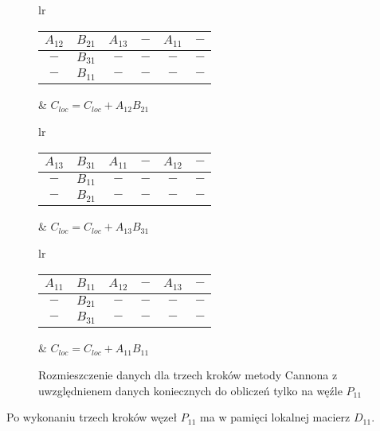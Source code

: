 \begin{figure}[h]
\centering
\begin{tabular}{lr}
\begin{tabular}{|cc|cc|cc|}
\hline
\(A_{12}\) & \(B_{21}\) & \(A_{13}\) & \(-\) & \(A_{11}\) & \(-\) \\
\hline
\(-\) & \(B_{31}\) & \(-\) & \(-\) & \(-\) & \(-\) \\
\hline
\(-\) & \(B_{11}\) & \(-\) & \(-\) & \(-\) & \(-\) \\
\hline
\end{tabular} &
\hspace{1cm}\(C_{loc}=C_{loc}+A_{12}B_{21}\)
\end{tabular}

\vspace{0.5cm}

\begin{tabular}{lr}
\begin{tabular}{|cc|cc|cc|}
\hline
\(A_{13}\) & \(B_{31}\) & \(A_{11}\) & \(-\) & \(A_{12}\) & \(-\) \\
\hline
\(-\) & \(B_{11}\) & \(-\) & \(-\) & \(-\) & \(-\) \\
\hline
\(-\) & \(B_{21}\) & \(-\) & \(-\) & \(-\) & \(-\) \\
\hline
\end{tabular} &
\hspace{1cm}\(C_{loc}=C_{loc}+A_{13}B_{31}\)
\end{tabular}

\vspace{0.5cm}

\begin{tabular}{lr}
\begin{tabular}{|cc|cc|cc|}
\hline
\(A_{11}\) & \(B_{11}\) & \(A_{12}\) & \(-\) & \(A_{13}\) & \(-\) \\
\hline
\(-\) & \(B_{21}\) & \(-\) & \(-\) & \(-\) & \(-\) \\
\hline
\(-\) & \(B_{31}\) & \(-\) & \(-\) & \(-\) & \(-\) \\
\hline
\end{tabular} &
\hspace{1cm}\(C_{loc}=C_{loc}+A_{11}B_{11}\)
\end{tabular}
\caption{Rozmieszczenie danych dla trzech kroków metody Cannona z uwzględnienem danych koniecznych do obliczeń tylko na węźle \(P_{11}\)}
\label{fig:cannon_torus3}
\end{figure}

\noindent Po wykonaniu trzech kroków węzeł \(P_{11}\) ma w pamięci lokalnej macierz \(D_{11}\).

